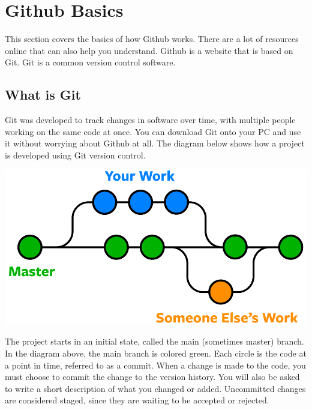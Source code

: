 \documentclass[
  letterpaper,
  DIV=11,
  numbers=noendperiod]{scrreprt}
\author{}
\date{}
\begin{document}
\ifdefined\Shaded\renewenvironment{Shaded}{\begin{tcolorbox}[borderline west={3pt}{0pt}{shadecolor}, enhanced, boxrule=0pt, sharp corners, interior hidden, frame hidden, breakable]}{\end{tcolorbox}}\fi

\hypertarget{github-basics}{%
\chapter{Github Basics}\label{github-basics}}

This section covers the basics of how Github works. There are a lot of
resources online that can also help you understand. Github is a website
that is based on Git. Git is a common version control software.

\hypertarget{what-is-git}{%
\section{What is Git}\label{what-is-git}}

Git was developed to track changes in software over time, with multiple
people working on the same code at once. You can download Git onto your
PC and use it without worrying about Github at all. The diagram below
shows how a project is developed using Git version control.

\includegraphics{Github_Basics_files/mediabag/git-branches-merge.png}

The project starts in an initial state, called the main (sometimes
master) branch. In the diagram above, the main branch is colored green.
Each circle is the code at a point in time, referred to as a commit.
When a change is made to the code, you must choose to commit the change
to the version history. You will also be asked to write a short
description of what you changed or added. Uncommitted changes are
considered staged, since they are waiting to be accepted or rejected.
\end{document}

